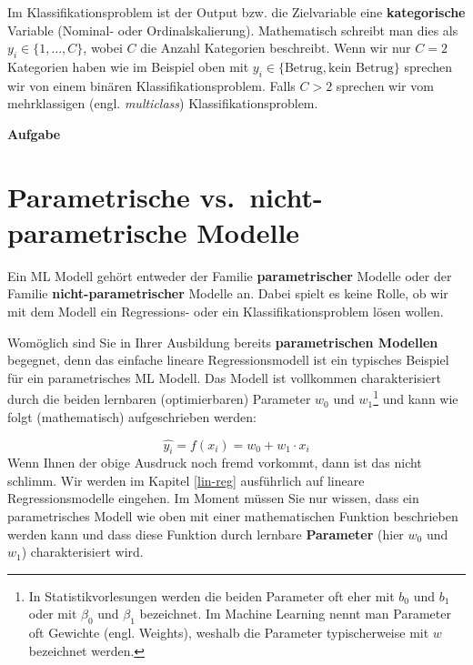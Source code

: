 \documentclass[
]{book}
\begin{document}
Im Klassifikationsproblem ist der Output bzw. die Zielvariable eine \textbf{kategorische} Variable (Nominal- oder Ordinalskalierung). Mathematisch schreibt man dies als \(y_i \in \{1, \dots, C\}\), wobei \(C\) die Anzahl Kategorien beschreibt. Wenn wir nur \(C=2\) Kategorien haben wie im Beispiel oben mit \(y_i \in \{\text{Betrug}, \text{kein Betrug}\}\) sprechen wir von einem binären Klassifikationsproblem. Falls \(C>2\) sprechen wir vom mehrklassigen (engl. \emph{multiclass}) Klassifikationsproblem.

\textbf{Aufgabe}

\hypertarget{parametrische-vs.-nicht-parametrische-modelle}{%
\section{Parametrische vs.~nicht-parametrische Modelle}\label{parametrische-vs.-nicht-parametrische-modelle}}

Ein ML Modell gehört entweder der Familie \textbf{parametrischer} Modelle oder der Familie \textbf{nicht-parametrischer} Modelle an. Dabei spielt es keine Rolle, ob wir mit dem Modell ein Regressions- oder ein Klassifikationsproblem lösen wollen.

Womöglich sind Sie in Ihrer Ausbildung bereits \textbf{parametrischen Modellen} begegnet, denn das einfache lineare Regressionsmodell ist ein typisches Beispiel für ein parametrisches ML Modell. Das Modell ist vollkommen charakterisiert durch die beiden lernbaren (optimierbaren) Parameter \(w_0\) und \(w_1\)\footnote{In Statistikvorlesungen werden die beiden Parameter oft eher mit \(b_0\) und \(b_1\) oder mit \(\beta_0\) und \(\beta_1\) bezeichnet. Im Machine Learning nennt man Parameter oft Gewichte (engl. Weights), weshalb die Parameter typischerweise mit \(w\) bezeichnet werden.} und kann wie folgt (mathematisch) aufgeschrieben werden:

\[
\hat{y_i} = f(x_i)=w_0 + w_1 \cdot x_i
\]
Wenn Ihnen der obige Ausdruck noch fremd vorkommt, dann ist das nicht schlimm. Wir werden im Kapitel \ref{lin-reg} ausführlich auf lineare Regressionsmodelle eingehen. Im Moment müssen Sie nur wissen, dass ein parametrisches Modell wie oben mit einer mathematischen Funktion beschrieben werden kann und dass diese Funktion durch lernbare \textbf{Parameter} (hier \(w_0\) und \(w_1\)) charakterisiert wird.
\end{document}
